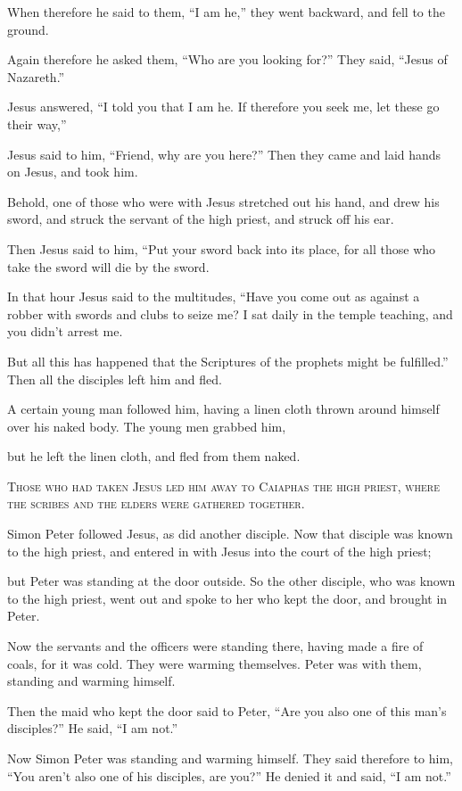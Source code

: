 When therefore he said to them, “I am he,” they went backward, and fell to the ground.

Again therefore he asked them, “Who are you looking for?” They said, “Jesus of Nazareth.”

Jesus answered, “I told you that I am he. If therefore you seek me, let these go their way,”

Jesus said to him, “Friend, why are you here?” Then they came and laid hands on Jesus, and took him.

Behold, one of those who were with Jesus stretched out his hand, and drew his sword, and struck the servant of the high priest, and struck off his ear.

Then Jesus said to him, “Put your sword back into its place, for all those who take the sword will die by the sword.

In that hour Jesus said to the multitudes, “Have you come out as against a robber with swords and clubs to seize me? I sat daily in the temple teaching, and you didn’t arrest me.

But all this has happened that the Scriptures of the prophets might be fulfilled.” Then all the disciples left him and fled.

A certain young man followed him, having a linen cloth thrown around himself over his naked body. The young men grabbed him,

but he left the linen cloth, and fled from them naked.



\lettrine{T}{hose who had taken Jesus led him away to Caiaphas the high priest, where the scribes and the elders were gathered together.}

Simon Peter followed Jesus, as did another disciple. Now that disciple was known to the high priest, and entered in with Jesus into the court of the high priest;

but Peter was standing at the door outside. So the other disciple, who was known to the high priest, went out and spoke to her who kept the door, and brought in Peter.

Now the servants and the officers were standing there, having made a fire of coals, for it was cold. They were warming themselves. Peter was with them, standing and warming himself.

Then the maid who kept the door said to Peter, “Are you also one of this man’s disciples?” He said, “I am not.”

Now Simon Peter was standing and warming himself. They said therefore to him, “You aren’t also one of his disciples, are you?” He denied it and said, “I am not.”

